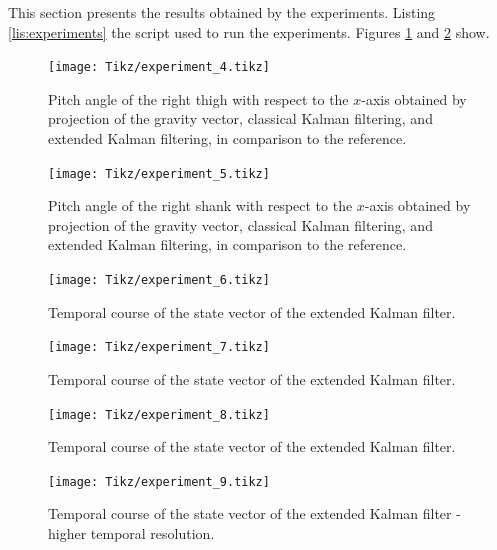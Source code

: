This section presents the results obtained by the experiments. Listing \ref{lis:experiments} the script used to run the experiments. Figures \ref{fig:experiment_4} and \ref{fig:experiment_5} show.

\begin{figure}
	\centering
	\setlength\figureheight{7cm} 
	\setlength\figurewidth{\textwidth}
	\texttt{[image: Tikz/experiment\_4.tikz]}
	\caption{Pitch angle of the right thigh with respect to the $x$-axis obtained by projection of the gravity vector, classical Kalman filtering, and extended Kalman filtering, in comparison to the reference.}
	\label{fig:experiment_4}
\end{figure}

\begin{figure}
	\centering
	\setlength\figureheight{7cm} 
	\setlength\figurewidth{\textwidth}
	\texttt{[image: Tikz/experiment\_5.tikz]}
	\caption{Pitch angle of the right shank with respect to the $x$-axis obtained by projection of the gravity vector, classical Kalman filtering, and extended Kalman filtering, in comparison to the reference.}
	\label{fig:experiment_5}
\end{figure}

\begin{figure}
	\centering
	\setlength\figureheight{7cm} 
	\setlength\figurewidth{\textwidth}
	\texttt{[image: Tikz/experiment\_6.tikz]}
	\caption{Temporal course of the state vector of the extended Kalman filter.}
	\label{fig:experiment_6}
\end{figure}

\begin{figure}
	\centering
	\setlength\figureheight{7cm} 
	\setlength\figurewidth{\textwidth}
	\texttt{[image: Tikz/experiment\_7.tikz]}
	\caption{Temporal course of the state vector of the extended Kalman filter.}
	\label{fig:experiment_7}
\end{figure}

\begin{figure}
	\centering
	\setlength\figureheight{7cm} 
	\setlength\figurewidth{\textwidth}
	\texttt{[image: Tikz/experiment\_8.tikz]}
	\caption{Temporal course of the state vector of the extended Kalman filter.}
	\label{fig:experiment_8}
\end{figure}

\begin{figure}
	\centering
	\setlength\figureheight{7cm} 
	\setlength\figurewidth{\textwidth}
	\texttt{[image: Tikz/experiment\_9.tikz]}
	\caption{Temporal course of the state vector of the extended Kalman filter - higher temporal resolution.}
	\label{fig:experiment_9}
\end{figure}

